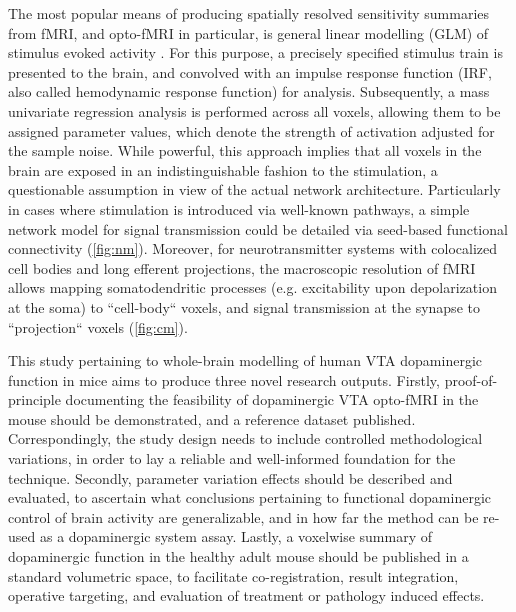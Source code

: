 The most popular means of producing spatially resolved sensitivity summaries from fMRI, and opto-fMRI in particular, is general linear modelling (GLM) of stimulus evoked activity \cite{Friston1995}.
For this purpose, a precisely specified stimulus train is presented to the brain, and convolved with an impulse response function (IRF, also called hemodynamic response function) for analysis.
Subsequently, a mass univariate regression analysis is performed across all voxels, allowing them to be assigned parameter values, which denote the strength of activation adjusted for the sample noise.
While powerful, this approach implies that all voxels in the brain are exposed in an indistinguishable fashion to the stimulation, a questionable assumption in view of the actual network architecture.
Particularly in cases where stimulation is introduced via well-known pathways, a simple network model for signal transmission could be detailed via seed-based functional connectivity (\cref{fig:nm}).
Moreover, for neurotransmitter systems with colocalized cell bodies and long efferent projections, the macroscopic resolution of fMRI allows mapping somatodendritic processes (e.g. excitability upon depolarization at the soma) to “cell-body“ voxels, and signal transmission at the synapse to “projection“ voxels (\cref{fig:cm}).

This study pertaining to whole-brain modelling of human VTA dopaminergic function in mice aims to produce three novel research outputs.
Firstly, proof-of-principle documenting the feasibility of dopaminergic VTA opto-fMRI in the mouse should be demonstrated, and a reference dataset published.
Correspondingly, the study design needs to include controlled methodological variations, in order to lay a reliable and well-informed foundation for the technique.
Secondly, parameter variation effects should be described and evaluated, to ascertain what conclusions pertaining to functional dopaminergic control of brain activity are generalizable, and in how far the method can be re-used as a dopaminergic system assay.
Lastly, a voxelwise summary of dopaminergic function in the healthy adult mouse should be published in a standard volumetric space, to facilitate co-registration, result integration, operative targeting, and evaluation of treatment or pathology induced effects.
